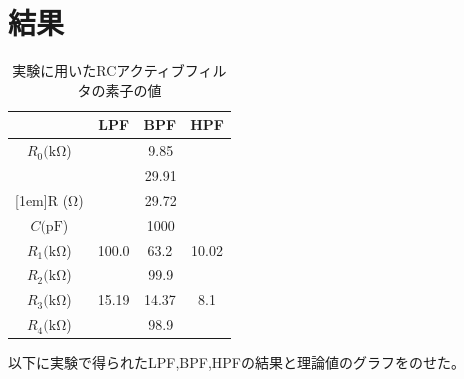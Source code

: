 \documentclass[11pt,a4j]{jsarticle}
\begin{document}
\section{結果}

\begin{table}[H]
  \caption{実験に用いたRCアクティブフィルタの素子の値}
  \label{tab:rc}
  \begin{center}
      \begin{tabular}{|c|c|c|c|}
        \hline
         & LPF & BPF & HPF \\ \hline
        $ R_{0}  (\mathrm{k\Omega}$) & \multicolumn{3}{c|}{9.85} \\ \hline
         & \multicolumn{3}{c|}{29.91} \\ \cline{2-4}
        \raisebox{0.8em}[1em]{R  ($\mathrm{\Omega}$)} & \multicolumn{3}{c|}{29.72} \\ \hline
        $ C  (\mathrm{pF}$) & \multicolumn{3}{c|}{1000} \\ \hline
        $ R_{1}  (\mathrm{k\Omega}$) & 100.0 & 63.2 & 10.02 \\ \hline
        $ R_{2}  (\mathrm{k\Omega}$) & \multicolumn{3}{c|}{99.9} \\ \hline
        $ R_{3}  (\mathrm{k\Omega}$) & 15.19 & 14.37 & 8.1 \\ \hline
        $ R_{4}  (\mathrm{k\Omega}$) & \multicolumn{3}{c|}{98.9} \\ \hline

      \end{tabular}
  \end{center}
\end{table}


以下に実験で得られたLPF,BPF,HPFの結果と理論値のグラフをのせた。
\end{document}
